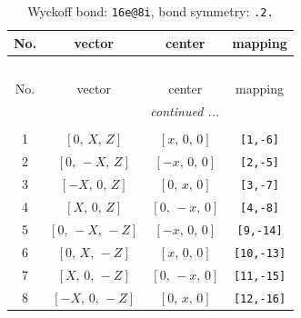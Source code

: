 \documentclass[fleqn,8pt]{jsarticle}
\begin{document}
\begin{longtable}{cccc}
\caption{Wyckoff bond: {\tt 16e@8i}, bond symmetry: {\tt .2.}}
 \\
 \hline \hline
No. & vector & center & mapping \\ \hline \endfirsthead

\multicolumn{3}{l}{\tablename\ \thetable{}} \\
 \hline \hline
No. & vector & center & mapping \\ \hline \endhead

 \hline \hline
\multicolumn{3}{r}{\footnotesize\it continued ...} \\ \endfoot

 \hline \hline
\multicolumn{3}{r}{} \\ \endlastfoot

1 & $\left[ 0,\, X,\, Z \right]$ & $\left[ x,\, 0,\, 0 \right]$ & {\tt [1,-6]} \\ \hline
2 & $\left[ 0,\, - X,\, Z \right]$ & $\left[ - x,\, 0,\, 0 \right]$ & {\tt [2,-5]} \\ \hline
3 & $\left[ - X,\, 0,\, Z \right]$ & $\left[ 0,\, x,\, 0 \right]$ & {\tt [3,-7]} \\ \hline
4 & $\left[ X,\, 0,\, Z \right]$ & $\left[ 0,\, - x,\, 0 \right]$ & {\tt [4,-8]} \\ \hline
5 & $\left[ 0,\, - X,\, - Z \right]$ & $\left[ - x,\, 0,\, 0 \right]$ & {\tt [9,-14]} \\ \hline
6 & $\left[ 0,\, X,\, - Z \right]$ & $\left[ x,\, 0,\, 0 \right]$ & {\tt [10,-13]} \\ \hline
7 & $\left[ X,\, 0,\, - Z \right]$ & $\left[ 0,\, - x,\, 0 \right]$ & {\tt [11,-15]} \\ \hline
8 & $\left[ - X,\, 0,\, - Z \right]$ & $\left[ 0,\, x,\, 0 \right]$ & {\tt [12,-16]} \\
\end{longtable}
\renewcommand{\arraystretch}{1.2}
\end{document}
